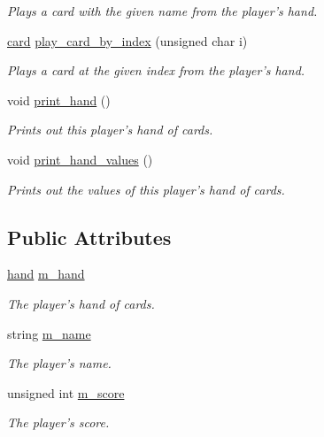 \begin{DoxyCompactItemize}
\begin{DoxyCompactList}\small\item\em \-Plays a card with the given name from the player's hand. \end{DoxyCompactList}\item 
\hyperlink{uno__card_8h_ab16a632e2e3f1f154cce75648902eb83}{card} \hyperlink{class_uno___player_abe1a86f4792fa9e703ffeb28e453160f}{play\-\_\-card\-\_\-by\-\_\-index} (unsigned char i)
\begin{DoxyCompactList}\small\item\em \-Plays a card at the given index from the player's hand. \end{DoxyCompactList}\item 
void \hyperlink{class_uno___player_a3af4557fcf900bc6357000449ecb5860}{print\-\_\-hand} ()
\begin{DoxyCompactList}\small\item\em \-Prints out this player's hand of cards. \end{DoxyCompactList}\item 
void \hyperlink{class_uno___player_a17a542fc645418ee806c79ebe253a62e}{print\-\_\-hand\-\_\-values} ()
\begin{DoxyCompactList}\small\item\em \-Prints out the values of this player's hand of cards. \end{DoxyCompactList}\end{DoxyCompactItemize}
\subsection*{\-Public \-Attributes}
\begin{DoxyCompactItemize}
\item 
\hyperlink{uno__player_8h_acd9523c15e47a87e3740cf5ade73556e}{hand} \hyperlink{class_uno___player_a9d50084b9fd4b005286ffdaa004f2664}{m\-\_\-hand}
\begin{DoxyCompactList}\small\item\em \-The player's hand of cards. \end{DoxyCompactList}\item 
string \hyperlink{class_uno___player_a06af109b4d621efa14ba98e4c9395739}{m\-\_\-name}
\begin{DoxyCompactList}\small\item\em \-The player's name. \end{DoxyCompactList}\item 
unsigned int \hyperlink{class_uno___player_a9805f306a500b1898c0a0922d76de444}{m\-\_\-score}
\begin{DoxyCompactList}\small\item\em \-The player's score. \end{DoxyCompactList}\end{DoxyCompactItemize}


